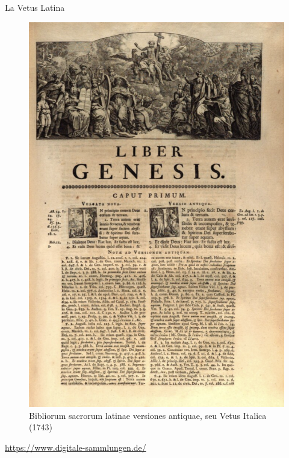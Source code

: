 \documentclass[11pt]{beamer}
\begin{document}
\begin{frame}{La Vetus Latina}
\begin{figure}
    \centering
    \includegraphics[width=0.5\linewidth]{img/vetus_latina_sabatier.png}
    \caption{Bibliorum sacrorum latinae versiones antiquae, seu Vetus Italica (1743)}
\end{figure}
\end{frame}
\begin{block}{}
    \href{https://www.digitale-sammlungen.de/en/view/bsb10798848?q=%28Bibliorum+sacrorum+latinae+versiones+antiquae%29&page=112,113}{https://www.digitale-sammlungen.de/}
\end{block}
\end{document}

